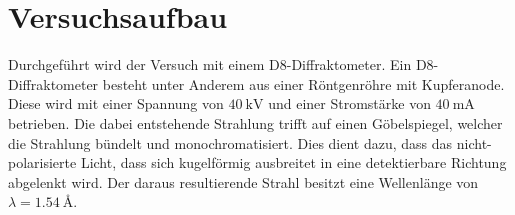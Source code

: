 \newpage
\section{Versuchsaufbau}
\label{sec:Aufbau}
Durchgeführt wird der Versuch mit einem D8-Diffraktometer.
Ein D8-Diffraktometer besteht unter Anderem aus einer Röntgenröhre mit Kupferanode. Diese wird mit einer Spannung von $\SI{40}{\kilo\volt}$ und
einer Stromstärke von $\SI{40}{\milli\ampere}$ betrieben. Die dabei entstehende Strahlung trifft auf einen Göbelspiegel, welcher die Strahlung
bündelt und monochromatisiert. Dies dient dazu, dass das nicht-polarisierte Licht, dass sich kugelförmig ausbreitet in eine
detektierbare Richtung abgelenkt wird. Der daraus resultierende Strahl besitzt eine Wellenlänge von $\lambda = \SI{1.54}{\angstrom}$.
